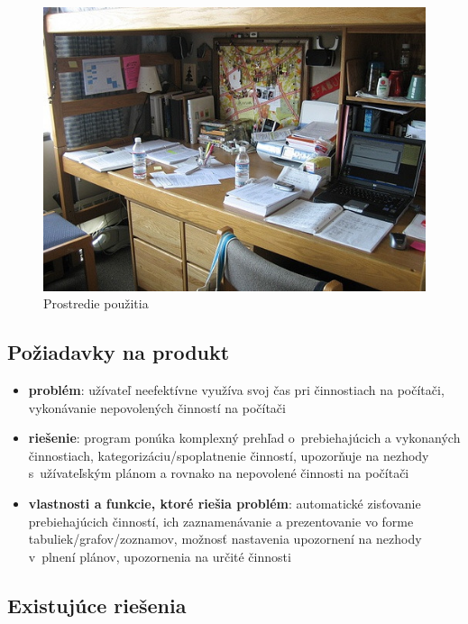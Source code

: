 \documentclass[]{article}
\begin{document}
\begin{figure}[h!]
	\includegraphics[width=\textwidth]{prostredie}
	\caption{Prostredie použitia}
\end{figure}

\newpage

\subsection{Požiadavky na produkt}

\begin{itemize}
	\item \textbf{problém}: užívateľ neefektívne využíva svoj čas pri činnostiach na 	počítači, vykonávanie nepovolených činností na počítači
	\item \textbf{riešenie}: program ponúka komplexný prehľad o~prebiehajúcich a vykonaných činnostiach, kategorizáciu/spoplatnenie činností, upozorňuje na nezhody s~užívateľským plánom a rovnako na nepovolené činnosti na počítači
	\item \textbf{vlastnosti a funkcie, ktoré riešia problém}: automatické zisťovanie prebiehajúcich činností, ich zaznamenávanie a prezentovanie vo forme tabuliek/grafov/zoznamov, možnosť nastavenia upozornení na nezhody v~plnení plánov, upozornenia na určité činnosti
\end{itemize}

\subsection{Existujúce riešenia}
\end{document}

